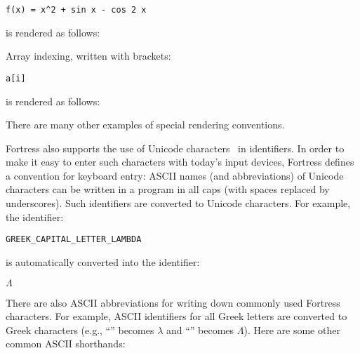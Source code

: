 \begin{verbatim}
f(x) = x^2 + sin x - cos 2 x
\end{verbatim}

is rendered as follows:



Array indexing, written with brackets:

\begin{verbatim}
a[i]
\end{verbatim}

is rendered as follows:



There are many other examples of special rendering conventions.

Fortress also supports the use of Unicode characters~\cite{Unicode} in
identifiers. In order to make it easy to enter such characters with
today's input devices, Fortress defines a convention for keyboard
entry: ASCII names (and abbreviations) of Unicode characters can be
written in a program in all caps (with spaces replaced by underscores).
Such identifiers are converted to Unicode characters. For example,
the identifier:

\begin{verbatim}
GREEK_CAPITAL_LETTER_LAMBDA
\end{verbatim}

is automatically converted into the identifier:

$\Lambda$

There are also ASCII abbreviations for writing down commonly used
Fortress characters. For example, ASCII identifiers for all Greek
letters are converted to Greek characters
(e.g., ``'' becomes $\lambda$
and ``'' becomes $\Lambda$).
Here are some other common ASCII shorthands:

